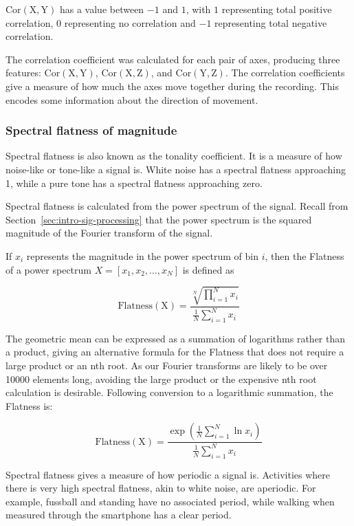         $\mathrm{Cor(X,Y)}$ has a value between $-1$ and $1$, with $1$ representing total positive correlation, $0$ representing no correlation and $-1$ representing total negative correlation.
         
        The correlation coefficient was calculated for each pair of axes, producing three features: $\mathrm{Cor(X,Y)}$, $\mathrm{Cor(X,Z)}$, and $\mathrm{Cor(Y,Z)}$. The correlation coefficients give a measure of how much the axes move together during the recording. This encodes some information about the direction of movement.
      \subsubsection{Spectral flatness of magnitude}
        Spectral flatness is also known as the tonality coefficient. It is a measure of how noise-like or tone-like a signal is. White noise has a spectral flatness approaching 1, while a pure tone has a spectral flatness approaching zero.
        
        Spectral flatness is calculated from the power spectrum of the signal. Recall from Section~\ref{sec:intro-sig-processing} that the power spectrum is the squared magnitude of the Fourier transform of the signal.
        
        If $x_i$ represents the magnitude in the power spectrum of bin $i$, then the Flatness of a power spectrum $X = [x_1, x_2, \dots , x_N]$ is defined as
        
        $$\mathrm{Flatness(X)} = \frac{\sqrt[N]{\prod\limits_{i=1}^N x_i}}{\frac{1}{N}\sum_{i=1}^N x_i}$$
        
        The geometric mean can be expressed as a summation of logarithms rather than a product, giving an alternative formula for the Flatness that does not require a large product or an nth root. As our Fourier transforms are likely to be over 10000 elements long, avoiding the large product or the expensive nth root calculation is desirable. Following conversion to a logarithmic summation, the Flatness is:
        
        $$\mathrm{Flatness(X)} = \frac{\exp \left( \frac{1}{N}\sum\limits_{i=1}^N \ln x_i \right) }{\frac{1}{N}\sum_{i=1}^N x_i}$$
        
        Spectral flatness gives a measure of how periodic a signal is. Activities where there is very high spectral flatness, akin to white noise, are aperiodic. For example, fussball and standing have no associated period, while walking when measured through the smartphone has a clear period.
